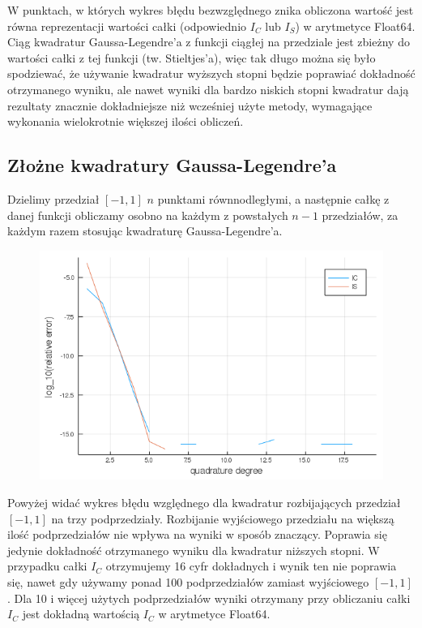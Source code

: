 \documentclass{article}
\begin{document}
\newpage
W punktach, w których wykres błędu bezwzględnego znika obliczona wartość jest równa reprezentacji wartości całki (odpowiednio $I_C$ lub $I_S$) w arytmetyce Float64. Ciąg kwadratur Gaussa-Legendre'a z funkcji ciągłej na przedziale jest zbieżny do wartości całki z tej funkcji (tw. Stieltjes'a), więc tak długo można się było spodziewać, że używanie kwadratur wyższych stopni będzie poprawiać dokładność otrzymanego wyniku, ale nawet wyniki dla bardzo niskich stopni kwadratur dają rezultaty znacznie dokładniejsze niż wcześniej użyte metody, wymagające wykonania wielokrotnie większej ilości obliczeń.

\subsection*{Złożne kwadratury Gaussa-Legendre'a}
	Dzielimy przedział $[-1,1]$ $n$ punktami równnodległymi, a następnie całkę z danej funkcji obliczamy osobno na każdym z powstałych $n-1$ przedziałów, za każdym razem stosując kwadraturę Gaussa-Legendre'a. 

\begin{figure}[ht]
    \includegraphics[scale=0.5]{WykresD2logrelative.png}
    \label{WykresD2}
\end{figure}
Powyżej widać wykres błędu względnego dla kwadratur rozbijających przedział $[-1,1]$ na trzy podprzedziały. Rozbijanie wyjściowego przedziału na większą ilość podprzedziałów nie wpływa na wyniki w sposób znaczący. Poprawia się jedynie dokładność otrzymanego wyniku dla kwadratur niższych stopni. W przypadku całki $I_C$ otrzymujemy 16 cyfr dokładnych i wynik ten nie poprawia się, nawet gdy używamy ponad 100 podprzedziałów zamiast wyjściowego $[-1,1]$. Dla 10 i więcej użytych podprzedziałów wyniki otrzymany przy obliczaniu całki $I_C$ jest dokładną wartością $I_C$ w arytmetyce Float64.  
\end{document}
